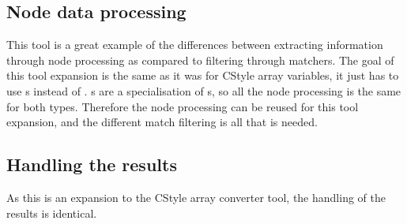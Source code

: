 \subsection{Node data processing}

This tool is a great example of the differences between extracting information through node processing as compared to filtering through matchers. The goal of this tool expansion is the same as it was for CStyle array variables, it just has to use s instead of . s are a specialisation of s, so all the node processing is the same for both types. Therefore the node processing can be reused for this tool expansion, and the different match filtering is all that is needed.

\subsection{Handling the results}

As this is an expansion to the CStyle array converter tool, the handling of the results is identical.